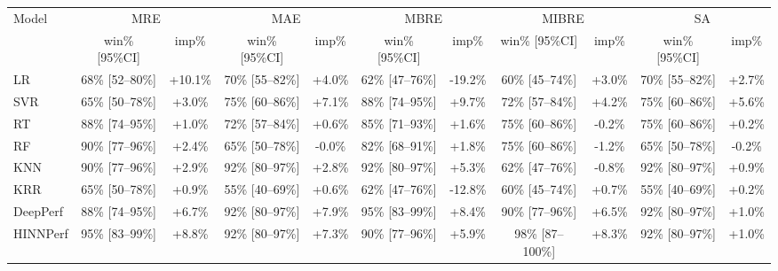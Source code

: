 \begin{tabular}{lcccccccccc}
\toprule
Model & \multicolumn{2}{c}{MRE} & \multicolumn{2}{c}{MAE} & \multicolumn{2}{c}{MBRE} & \multicolumn{2}{c}{MIBRE} & \multicolumn{2}{c}{SA} \\
& win\% [95\%CI] & imp\% & win\% [95\%CI] & imp\% & win\% [95\%CI] & imp\% & win\% [95\%CI] & imp\% & win\% [95\%CI] & imp\% \\
\midrule
LR & 68\% [52--80\%] & +10.1\% & 70\% [55--82\%] & +4.0\% & 62\% [47--76\%] & -19.2\% & 60\% [45--74\%] & +3.0\% & 70\% [55--82\%] & +2.7\% \\
SVR & 65\% [50--78\%] & +3.0\% & 75\% [60--86\%] & +7.1\% & 88\% [74--95\%] & +9.7\% & 72\% [57--84\%] & +4.2\% & 75\% [60--86\%] & +5.6\% \\
RT & 88\% [74--95\%] & +1.0\% & 72\% [57--84\%] & +0.6\% & 85\% [71--93\%] & +1.6\% & 75\% [60--86\%] & -0.2\% & 75\% [60--86\%] & +0.2\% \\
RF & 90\% [77--96\%] & +2.4\% & 65\% [50--78\%] & -0.0\% & 82\% [68--91\%] & +1.8\% & 75\% [60--86\%] & -1.2\% & 65\% [50--78\%] & -0.2\% \\
KNN & 90\% [77--96\%] & +2.9\% & 92\% [80--97\%] & +2.8\% & 92\% [80--97\%] & +5.3\% & 62\% [47--76\%] & -0.8\% & 92\% [80--97\%] & +0.9\% \\
KRR & 65\% [50--78\%] & +0.9\% & 55\% [40--69\%] & +0.6\% & 62\% [47--76\%] & -12.8\% & 60\% [45--74\%] & +0.7\% & 55\% [40--69\%] & +0.2\% \\
DeepPerf & 88\% [74--95\%] & +6.7\% & 92\% [80--97\%] & +7.9\% & 95\% [83--99\%] & +8.4\% & 90\% [77--96\%] & +6.5\% & 92\% [80--97\%] & +1.0\% \\
HINNPerf & 95\% [83--99\%] & +8.8\% & 92\% [80--97\%] & +7.3\% & 90\% [77--96\%] & +5.9\% & 98\% [87--100\%] & +8.3\% & 92\% [80--97\%] & +1.0\% \\
\bottomrule
\end{tabular}
